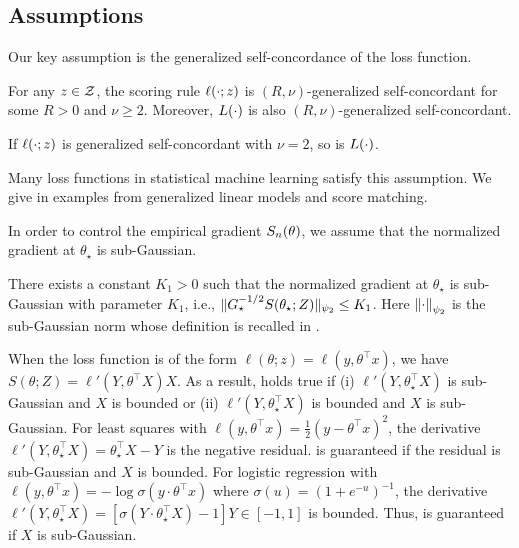 \subsection{Assumptions}
\label{sub:assumption}

Our key assumption is the generalized self-concordance of the loss function.
\begin{assumption}
\label{asmp:self_concordance}
    For any $z \in \mathcal{Z}$, the scoring rule $\ell(\cdot; z)$ is $(R, \nu)$-generalized self-concordant for some $R > 0$ and $\nu \ge 2$.
    Moreover, $L(\cdot)$ is also $(R, \nu)$-generalized self-concordant.
\end{assumption}

If $\ell(\cdot; z)$ is generalized self-concordant with $\nu = 2$, so is $L(\cdot)$.

Many loss functions in statistical machine learning satisfy this assumption.
We give in  examples from generalized linear models and score matching.


In order to control the empirical gradient $S_n(\theta)$, we assume that the normalized gradient at $\theta_\star$ is sub-Gaussian.
\begin{assumption}
\label{asmp:sub_gaussian}
    There exists a constant $K_1 > 0$ such that the normalized gradient at $\theta_\star$ is sub-Gaussian with parameter $K_1$, i.e., $\lVert G_\star^{-1/2} S(\theta_\star; Z) \rVert_{\psi_2} \le K_1$.
    Here $\left\lVert \cdot \right\rVert_{\psi_2}$ is the sub-Gaussian norm whose definition is recalled in .
\end{assumption}

When the loss function is of the form $\ell(\theta; z) = \ell(y, \theta^\top x)$, we have $S(\theta; Z) = \ell'(Y, \theta^\top X) X$.
As a result,  holds true if (i) $\ell'(Y, \theta_\star^\top X)$ is sub-Gaussian and $X$ is bounded or (ii) $\ell'(Y, \theta_\star^\top X)$ is bounded and $X$ is sub-Gaussian.
For least squares with $\ell(y, \theta^\top x) = \frac12 (y - \theta^\top x)^2$, the derivative $\ell'(Y, \theta_\star^\top X) = \theta_\star^\top X - Y$ is the negative residual.
 is guaranteed if the residual is sub-Gaussian and $X$ is bounded.
For logistic regression with $\ell(y, \theta^\top x) = -\log{\sigma(y\cdot \theta^\top x)}$ where $\sigma(u) = (1 + e^{-u})^{-1}$, the derivative $\ell'(Y, \theta_\star^\top X) = [\sigma(Y \cdot \theta_\star^\top X) - 1]Y \in [-1, 1]$ is bounded.
Thus,  is guaranteed if $X$ is sub-Gaussian.

